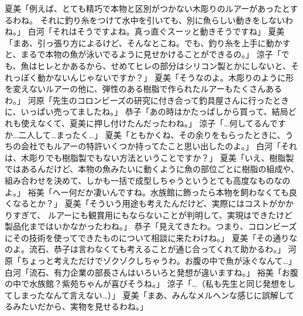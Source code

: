 夏美「例えば、とても精巧で本物と区別がつかない木彫りのルアーがあったとするわね。
それに釣り糸をつけて水中を引いても、別に魚らしい動きをしないわね。」
白河「それはそうですよね。真っ直ぐスーッと動きそうですね」
夏美「まあ、引っ張り方によるけど、そんなとこね。でも、釣り糸を上手に動かすと、まるで本物の魚が泳いでるように見せかけることができるの。」
涼子「でも、魚はヒレとかあるから、せめてヒレの部分はシリコン製とかにしないと、それっぽく動かないんじゃないですか？」
夏美「そうなのよ。木彫りのように形を変えないルアーの他に、弾性のある樹脂で作られたルアーもたくさんあるわ。」
河原「先生のコロンビーズの研究に付き合って釣具屋さんに行ったときに、いっぱい売ってましたね。」
恭子「あの時はかたっぱしから買って、結局どれも使えなくて、夏美に押し付けたんだったわね。」
涼子「…何してるんですか…二人して…まったく…」
夏美「ともかくね、その余りをもらったときに、うちの会社でもルアーの特許いくつか持ってたこと思い出したのよ。」
白河「それは、木彫りでも樹脂製でもない方法ということですか？」
夏美「いえ、樹脂製ではあるんだけど、本物の魚みたいに動くように魚の部位ごとに樹脂の組成や、
組み合わせを決めて、しかも一括で成型しちゃうというとても高度なものなのよ。」
裕美「へー何だか凄いんですね。水族館に飾ったら本物を飼わなくても良くなるとか？」
夏美「そういう用途も考えたんだけど、実際にはコストがかかりすぎて、
ルアーにも観賞用にもならないことが判明して、実現はできたけど製品化まではいかなかったわね。」
恭子「見えてきたわ。つまり、コロンビーズにその技術を使ってできたものについて相談に来たわけね。」
夏美「その通りなのよ。流石、恭子は言わなくても考えることが通じ合ってくれて助かるわ。」
河原「ちょっと考えただけでゾクゾクしちゃうわ。お腹の中で魚が泳ぐなんて…」
白河「流石、有力企業の部長さんはいろいろと発想が違いますね。」
裕美「お腹の中で水族館？紫苑ちゃんが喜びそうね。」
涼子「…（私も先生と同じ発想をしてしまったなんて言えない…）」
夏美「まあ、みんなメルヘンな感じに誤解してるみたいだから、実物を見せるわね。」

